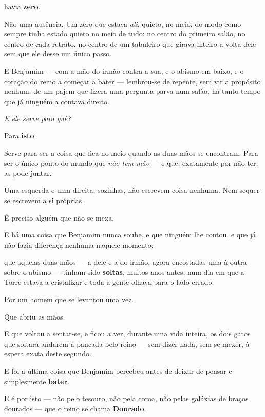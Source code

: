 \documentclass[livro.tex]{subfiles}
\begin{document}
havia \textbf{zero}.

\medskip

Não uma ausência. Um zero que estava \emph{ali}, quieto, no meio, do modo como sempre tinha estado quieto no meio
de tudo: no centro do primeiro salão, no centro de cada retrato, no centro de um tabuleiro que girava inteiro à
volta dele sem que ele desse um único passo.

E Benjamim --- com a mão do irmão contra a sua, e o abismo em baixo, e o coração do reino a começar a bater ---
lembrou-se de repente, sem vir a propósito nenhum, de um pajem que fizera uma pergunta parva num salão, há tanto
tempo que já ninguém a contava direito.

\emph{E ele serve para quê?}

\medskip

Para \textbf{isto}.

Serve para ser a coisa que fica no meio quando as duas mãos se encontram. Para ser o único ponto do mundo que
\emph{não tem mão} --- e que, exatamente por não ter, as pode juntar.

Uma esquerda e uma direita, sozinhas, não escrevem coisa nenhuma. Nem sequer se escrevem a si próprias.

É preciso alguém que não se mexa.

\medskip

E há uma coisa que Benjamim nunca soube, e que ninguém lhe contou, e que já não fazia diferença nenhuma naquele
momento:

que aquelas duas mãos --- a dele e a do irmão, agora encostadas uma à outra sobre o abismo --- tinham sido
\textbf{soltas}, muitos anos antes, num dia em que a Torre estava a cristalizar e toda a gente olhava para o lado
errado.

Por um homem que se levantou uma vez.

Que abriu as mãos.

E que voltou a sentar-se, e ficou a ver, durante uma vida inteira, os dois gatos que soltara andarem à pancada pelo
reino --- sem dizer nada, sem se mexer, à espera exata deste segundo.

\medskip

E foi a última coisa que Benjamim percebeu antes de deixar de pensar e simplesmente \textbf{bater}.

\medskip

E é por isto --- não pelo tesouro, não pela coroa, não pelas galáxias de braços dourados --- que o reino se chama
\textbf{Dourado}.
\end{document}
